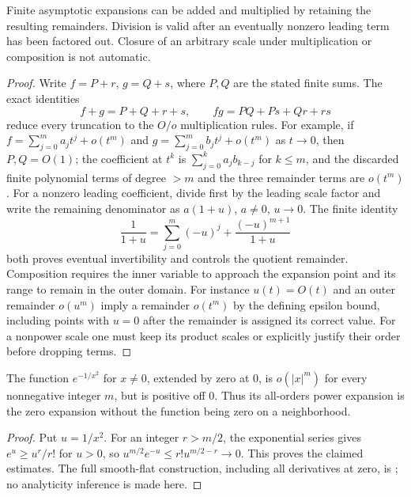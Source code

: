 \begin{proposition}
Finite asymptotic expansions can be added and multiplied by retaining the
resulting remainders. Division is valid after an eventually nonzero leading
term has been factored out. Closure of an arbitrary scale under multiplication
or composition is not automatic.
\end{proposition}
\begin{proof}
Write $f=P+r$, $g=Q+s$, where $P,Q$ are the stated finite sums. The exact
identities
\[
 f+g=P+Q+r+s,\qquad fg=PQ+Ps+Qr+rs
\]
reduce every truncation to the $O/o$ multiplication rules. For example, if
$f=\sum_{j=0}^m a_jt^j+o(t^m)$ and
$g=\sum_{j=0}^m b_jt^j+o(t^m)$ as $t\to0$, then $P,Q=O(1)$;
the coefficient at $t^k$ is $\sum_{j=0}^ka_jb_{k-j}$ for $k\leq m$, and
the discarded finite polynomial terms of degree $>m$ and the three remainder
terms are $o(t^m)$. For a nonzero leading coefficient, divide first by the
leading scale factor and write the remaining denominator as $a(1+u)$,
$a\ne0$, $u\to0$. The finite identity
\[
 \frac1{1+u}=\sum_{j=0}^{m}(-u)^j+
 \frac{(-u)^{m+1}}{1+u}
\]
both proves eventual invertibility and controls the quotient remainder.
Composition requires the inner variable to approach the expansion point and
its range to remain in the outer domain. For instance $u(t)=O(t)$ and an outer
remainder $o(u^m)$ imply a remainder $o(t^m)$ by the defining epsilon bound,
including points with $u=0$ after the remainder is assigned its correct value.
For a nonpower scale one must keep its product scales or explicitly justify
their order before dropping terms.
\end{proof}

\begin{example}
The function $e^{-1/x^2}$ for $x\ne0$, extended by zero at $0$, is
$o(|x|^m)$ for every nonnegative integer $m$, but is positive off $0$.
Thus its all-orders power expansion is the zero expansion without the function
being zero on a neighborhood.
\end{example}
\begin{proof}
Put $u=1/x^2$. For an integer $r>m/2$, the exponential series gives
$e^u\geq u^r/r!$ for $u>0$, so
$u^{m/2}e^{-u}\leq r!u^{m/2-r}\to0$. This proves the claimed estimates.
The full smooth-flat construction, including all derivatives at zero, is
; no analyticity inference is made here.
\end{proof}

